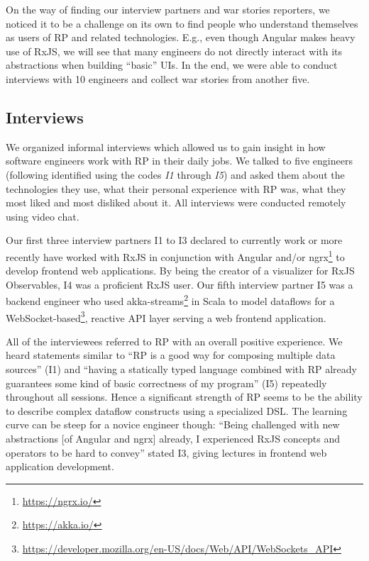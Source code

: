 \documentclass[sigplan,screen,review]{acmart}
\begin{document}
On the way of finding our interview partners and war stories reporters, we noticed it to be a challenge on its own to find people who understand themselves as users of RP and related technologies. E.g., even though Angular makes heavy use of RxJS, we will see that many engineers do not directly interact with its abstractions when building ``basic'' UIs. In the end, we were able to conduct interviews with 10 engineers and collect war stories from another five.

\subsection{Interviews}

We organized informal interviews which allowed us to gain insight in how software engineers work with RP in their daily jobs. We talked to five engineers (following identified using the codes \emph{I1} through \emph{I5}) and asked them about the technologies they use, what their personal experience with RP was, what they most liked and most disliked about it. All interviews were conducted remotely using video chat.

Our first three interview partners I1 to I3 declared to currently work or more recently have worked with RxJS in conjunction with Angular and/or ngrx\footnote{\url{https://ngrx.io/}} to develop frontend web applications. By being the creator of a visualizer for RxJS Observables, I4 was a proficient RxJS user. Our fifth interview partner I5 was a backend engineer who used akka-streams\footnote{\url{https://akka.io/}} in Scala to model dataflows for a WebSocket-based\footnote{\url{https://developer.mozilla.org/en-US/docs/Web/API/WebSockets_API}}, reactive API layer serving a web frontend application.

All of the interviewees referred to RP with an overall positive experience. We heard statements similar to ``RP is a good way for composing multiple data sources'' (I1) and ``having a statically typed language combined with RP already guarantees some kind of basic correctness of my program'' (I5) repeatedly throughout all sessions. Hence a significant strength of RP seems to be the ability to describe complex dataflow constructs using a specialized DSL. The learning curve can be steep for a novice engineer though: ``Being challenged with new abstractions [of Angular and ngrx] already, I experienced RxJS concepts and operators to be hard to convey'' stated I3, giving lectures in frontend web application development.
\end{document}
